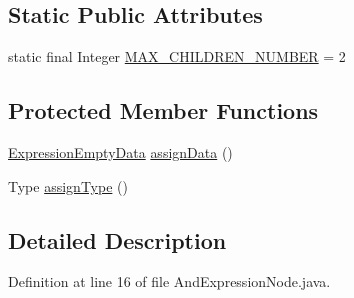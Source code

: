 \subsection*{Static Public Attributes}
\begin{DoxyCompactItemize}
\item 
static final Integer \hyperlink{classit_1_1emarolab_1_1cagg_1_1core_1_1language_1_1syntax_1_1expressionTree_1_1expressionNodeType_1_1AndExpressionNode_a24ad03cf5c74c53d915a5b186b24ce8c}{M\-A\-X\-\_\-\-C\-H\-I\-L\-D\-R\-E\-N\-\_\-\-N\-U\-M\-B\-E\-R} = 2
\end{DoxyCompactItemize}
\subsection*{Protected Member Functions}
\begin{DoxyCompactItemize}
\item 
\hyperlink{classit_1_1emarolab_1_1cagg_1_1core_1_1language_1_1syntax_1_1expressionTree_1_1ExpressionDataFactory_1_1ExpressionEmptyData}{Expression\-Empty\-Data} \hyperlink{classit_1_1emarolab_1_1cagg_1_1core_1_1language_1_1syntax_1_1expressionTree_1_1expressionNodeType_1_1AndExpressionNode_ac25a15fa5465dcbfd8523d38d61fce85}{assign\-Data} ()
\item 
Type \hyperlink{classit_1_1emarolab_1_1cagg_1_1core_1_1language_1_1syntax_1_1expressionTree_1_1expressionNodeType_1_1AndExpressionNode_aed3d27d8755549379b9fac629c9a4d07}{assign\-Type} ()
\end{DoxyCompactItemize}


\subsection{Detailed Description}


Definition at line 16 of file And\-Expression\-Node.\-java.




